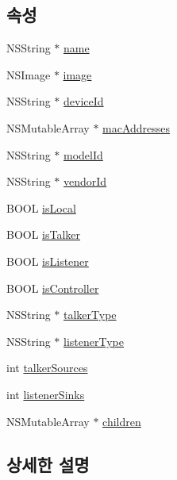 \subsection*{속성}
\begin{DoxyCompactItemize}
\item 
N\+S\+String $\ast$ \hyperlink{interface_avb_device_a4b93d352d2fca75b34e1b5a50e03f587}{name}
\item 
N\+S\+Image $\ast$ \hyperlink{interface_avb_device_a790b3bb624b6e726d31a50b21eb69854}{image}
\item 
N\+S\+String $\ast$ \hyperlink{interface_avb_device_ac90ae5b4cfd257c5ae22c3d4cce30dc4}{device\+Id}
\item 
N\+S\+Mutable\+Array $\ast$ \hyperlink{interface_avb_device_aed759aa4d0b84001e8542cbf2a659617}{mac\+Addresses}
\item 
N\+S\+String $\ast$ \hyperlink{interface_avb_device_ab91711bbaee9c1176ecc405d854068a3}{model\+Id}
\item 
N\+S\+String $\ast$ \hyperlink{interface_avb_device_a529162cb39492e7aefb7c0944a1aaac8}{vendor\+Id}
\item 
B\+O\+OL \hyperlink{interface_avb_device_a80370dd37373223251e9e63628e66d5b}{is\+Local}
\item 
B\+O\+OL \hyperlink{interface_avb_device_a0c9b72b73cb3178fd1b37ca16f2e05d6}{is\+Talker}
\item 
B\+O\+OL \hyperlink{interface_avb_device_a66a5987226b8fa5309dc6a4deb6a7165}{is\+Listener}
\item 
B\+O\+OL \hyperlink{interface_avb_device_adf3d67f37d278fcb4a584572d2d48d60}{is\+Controller}
\item 
N\+S\+String $\ast$ \hyperlink{interface_avb_device_a7057729d8a5a4ea18e2e897bad68691b}{talker\+Type}
\item 
N\+S\+String $\ast$ \hyperlink{interface_avb_device_a37c791219c5f1629f5675ba02a9f35d5}{listener\+Type}
\item 
int \hyperlink{interface_avb_device_a1ff74356f706ed929507e85dcf71b076}{talker\+Sources}
\item 
int \hyperlink{interface_avb_device_a51467b97f68b29de0f35ec25ac7a1882}{listener\+Sinks}
\item 
N\+S\+Mutable\+Array $\ast$ \hyperlink{interface_avb_device_a4287700a92cc0e6c456a71b2b95eae44}{children}
\end{DoxyCompactItemize}


\subsection{상세한 설명}


